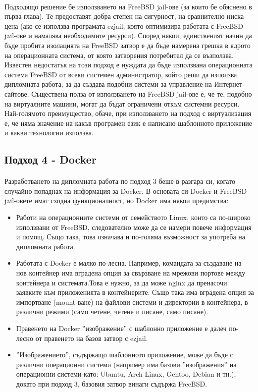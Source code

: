 \documentclass[pdftex,14pt,a4paper]{extreport}
\begin{document}
\paragraph {}

Подходящо решение бе използването на FreeBSD jail-ове (за които бе обяснено в първа глава). Те предоставят добра степен на сигурност, на сравнително ниска цена (ако се използва програмата ezjail, която оптимизира работата с FreeBSD jail-ове и намалява необходимите ресурси). Според някои, единственият начин да бъде пробита изолацията на FreeBSD затвор е да бъде намерена грешка в ядрото на операционната система, от която затворения потребител да се възползва. Известен недостатък на този подход е нуждата да бъде използвана операционната система FreeBSD от всеки системен администратор, който реши да използва дипломната работа, за да създава подобни системи за управление на Интернет сайтове. Съществена полза от използването на FreeBSD jail-ове е, че те, подобно на виртуалните машини, могат да бъдат ограничени откъм системни ресурси. Най-голямото преимущество, обаче, при използването на подход с виртуализация е, че няма значение на какъв програмен език е написано шаблонното приложение и какви технологии използва.
\subsection {Подход 4 - Docker}
\paragraph {}
Разработването на дипломната работа по подход 3 беше в разгара си, когато случайно попаднах на информация за Docker. В основата си Docker и FreeBSD jail-овете имат сходна функционалност, но Docker има някои предимства:
\begin{itemize}
  \item Работи на операционните системи от семейството Linux, които са по-широко използвани от FreeBSD, следователно може да се намери повече информация и помощ. Също така, това означава и по-голяма възможност за употреба на дипломната работа.
  \item Работата с Docker е малко по-лесна. Например, командата за създаване на нов контейнер има вградена опция за свързване на мрежови портове между контейнера и системата.Това е нужно, за да може nginx да пренасочи заявките към приложенията в контейнерите. Също така има вградена опция за импортване (mount-ване) на файлови системи и директории в контейнера, в различни режими (само четене, четене и писане, само писане).
  \item Правенето на Docker ''изображение'' с шаблонно приложение е далеч по-лесно от правенето на базов затвор с ezjail.
  \item ''Изображението'', съдържащо шаблонното приложение, може да бъде с различни операционни системи (например има базови ''изображения'' на операционни системи като: Ubuntu, Arch Linux, Gentoo, Debian и тн.), докато при подход 3, базовия затвор винаги съдържа FreeBSD.
\end{itemize}
\end{document}
